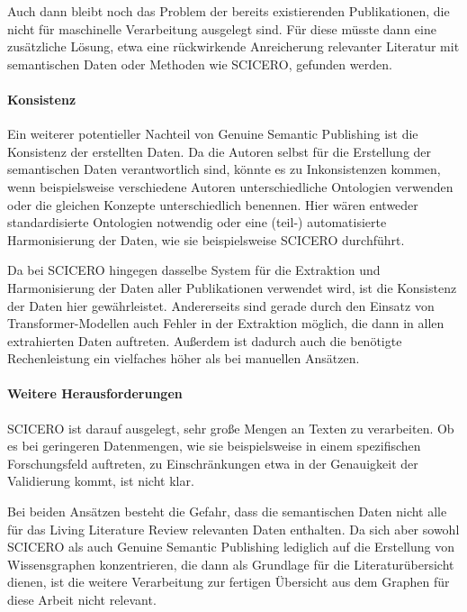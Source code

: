 Auch dann bleibt noch das Problem der bereits existierenden Publikationen, die nicht für maschinelle Verarbeitung ausgelegt sind.
Für diese müsste dann eine zusätzliche Lösung, etwa eine rückwirkende Anreicherung relevanter Literatur mit semantischen Daten oder Methoden wie SCICERO, gefunden werden.

\paragraph{Konsistenz}

Ein weiterer potentieller Nachteil von Genuine Semantic Publishing ist die Konsistenz der erstellten Daten.
Da die Autoren selbst für die Erstellung der semantischen Daten verantwortlich sind, könnte es zu Inkonsistenzen kommen, wenn beispielsweise verschiedene Autoren unterschiedliche Ontologien verwenden oder die gleichen Konzepte unterschiedlich benennen.
Hier wären entweder standardisierte Ontologien notwendig oder eine (teil-) automatisierte Harmonisierung der Daten, wie sie beispielsweise SCICERO durchführt.

Da bei SCICERO hingegen dasselbe System für die Extraktion und Harmonisierung der Daten aller Publikationen verwendet wird, ist die Konsistenz der Daten hier gewährleistet.
Andererseits sind \textemdash gerade durch den Einsatz von Transformer-Modellen \textemdash auch Fehler in der Extraktion möglich, die dann in allen extrahierten Daten auftreten.
Außerdem ist dadurch auch die benötigte Rechenleistung ein vielfaches höher als bei manuellen Ansätzen.


\paragraph{Weitere Herausforderungen}

SCICERO ist darauf ausgelegt, sehr große Mengen an Texten zu verarbeiten.
Ob es bei geringeren Datenmengen, wie sie beispielsweise in einem spezifischen Forschungsfeld auftreten, zu Einschränkungen \textemdash etwa in der Genauigkeit der Validierung \textemdash kommt, ist nicht klar.

Bei beiden Ansätzen besteht die Gefahr, dass die semantischen Daten nicht alle für das Living Literature Review relevanten Daten enthalten.
Da sich aber sowohl SCICERO als auch Genuine Semantic Publishing lediglich auf die Erstellung von Wissensgraphen konzentrieren, die dann als Grundlage für die Literaturübersicht dienen, ist die weitere Verarbeitung zur fertigen Übersicht aus dem Graphen für diese Arbeit nicht relevant.